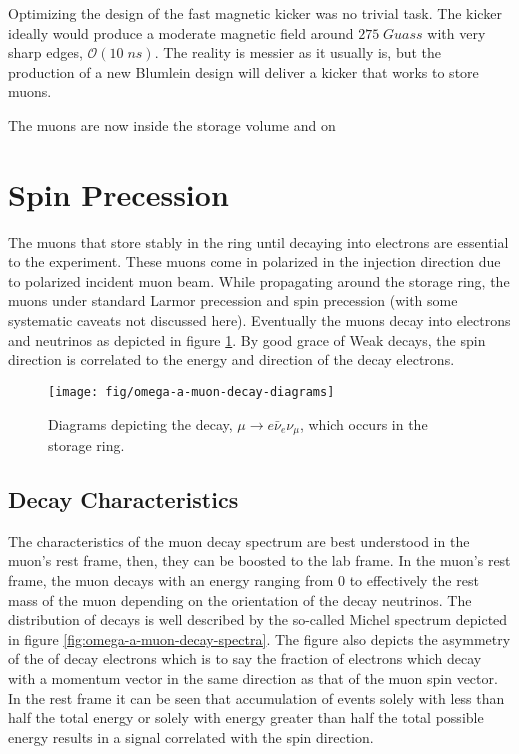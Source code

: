 Optimizing the design of the \gmtwo fast magnetic kicker was no trivial task.  The kicker ideally would produce a moderate magnetic field around $275\;Guass$ with very sharp edges, $\mathcal{O}(10\;ns)$. The reality is messier as it usually is, but the production of a new Blumlein  design will deliver a kicker that works to store muons.


The muons are now inside the storage volume and on 

\section{Spin Precession}

The muons that store stably in the ring until decaying into electrons are essential to the experiment.  These muons come in polarized in the injection direction due to polarized incident muon beam.  While propagating around the storage ring, the muons under standard Larmor precession and spin precession (with some systematic caveats not discussed here).  Eventually the muons decay into electrons and neutrinos as depicted in figure \ref{fig:omega-a-muon-decay-diagrams}.  By good grace of Weak decays, the spin direction is correlated to the energy and direction of the decay electrons.

\begin{figure}
\label{fig:omega-a-muon-decay-diagrams}
\texttt{[image: fig/omega-a-muon-decay-diagrams]}
\caption{Diagrams depicting the decay, $\mu \rightarrow e \bar{\nu}_e \nu_\mu$, which occurs in the \gmtwo storage ring.}
\end{figure}

\subsection{Decay Characteristics}

The characteristics of the muon decay spectrum are best understood in the muon's rest frame, then, they can be boosted to the lab frame.  In the muon's rest frame, the muon decays with an energy ranging from 0 to effectively the rest mass of the muon depending on the orientation of the decay neutrinos.  The distribution of decays is well described by the so-called Michel spectrum depicted in figure \ref{fig:omega-a-muon-decay-spectra}.  The figure also depicts the asymmetry of the of decay electrons which is to say the fraction of electrons which decay with a momentum vector in the same direction as that of the muon spin vector.  In the rest frame it can be seen that accumulation of events solely with less than half the total energy or solely with energy greater than half the total possible energy results in a signal correlated with the spin direction.


